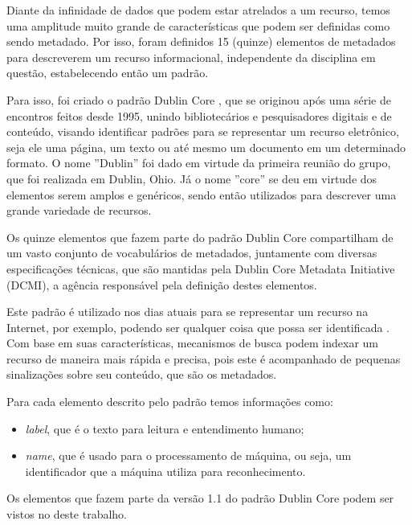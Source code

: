 \begin{textonovo}

Diante da infinidade de dados que podem estar atrelados a um recurso, temos uma amplitude muito grande de características que podem ser definidas como sendo metadado. Por isso, foram definidos 15 (quinze) elementos de metadados para descreverem um recurso informacional, independente da disciplina em questão, estabelecendo então um padrão. 

Para isso, foi criado o padrão Dublin Core \cite{dublin-core}, que se originou após uma série de encontros feitos desde 1995, unindo bibliotecários e pesquisadores digitais e de conteúdo, visando identificar padrões para se representar um recurso eletrônico, seja ele uma página, um texto ou até mesmo um documento em um determinado formato. O nome ''Dublin'' foi dado em virtude da primeira reunião do grupo, que foi realizada em Dublin, Ohio. Já o nome ''core'' se deu em virtude dos elementos serem amplos e genéricos, sendo então utilizados para descrever uma grande variedade de recursos.

Os quinze elementos que fazem parte do padrão Dublin Core compartilham de um vasto conjunto de vocabulários de metadados, juntamente com diversas especificações técnicas, que são mantidas pela Dublin Core Metadata Initiative (DCMI), a agência responsável pela definição destes elementos.

Este padrão é utilizado nos dias atuais para se representar um recurso na Internet, por exemplo, podendo ser qualquer coisa que possa ser identificada \cite{dublin-core-1-1}. Com base em suas características, mecanismos de busca podem indexar um recurso de maneira mais rápida e precisa, pois este é acompanhado de pequenas sinalizações sobre seu conteúdo, que são os metadados. 

Para cada elemento descrito pelo padrão temos informações como: 

\begin{itemize}
\item \textit{label}, que é o texto para leitura e entendimento humano;
\item \textit{name}, que é usado para o processamento de máquina, ou seja, um identificador que a máquina utiliza para reconhecimento.
\end{itemize}

Os elementos que fazem parte da versão 1.1 do padrão Dublin Core \cite{dublin-core-1-1} podem ser vistos no  deste trabalho.


\end{textonovo}
